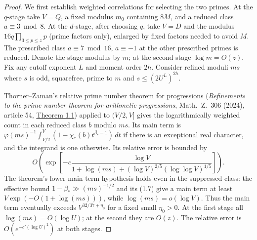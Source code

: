 \begin{proof}
We first establish weighted correlations for selecting the two primes.
At the \(q\)-stage take \(V=Q\), a fixed modulus \(m_0\) containing
\(8M\), and a reduced class \(a\equiv3\bmod8\).
At the \(d\)-stage, after choosing \(q\), take \(V=D\) and the
modulus \(16q\prod_{3\le p\le z}p\) (prime factors only), enlarged
by fixed factors needed to avoid \(M\).  The prescribed class
\(a\equiv7\bmod16\), \(a\equiv-1\) at the other prescribed primes
is reduced. Denote the stage modulus by \(m\); at the second
stage \(\log m=O(z)\).  Fix any cutoff exponent \(L\) and moment
order \(2h\). Consider refined moduli \(ms\) where \(s\) is odd,
squarefree, prime to \(m\) and \(s\le(2U^L)^{2h}\).

Thorner--Zaman's relative prime number theorem for progressions
(\emph{Refinements to the prime number theorem for arithmetic
progressions}, Math.\ Z.\ 306 (2024), article 54,
\href{https://arxiv.org/abs/2108.10878}{Theorem 1.1})
applied to \((V/2,V]\) gives the logarithmically weighted count
in each reduced class \(b\) modulo \(ms\). Its main term is
\(\varphi(ms)^{-1}\int_{V/2}^V(1-\chi_*(b)t^{\beta_*-1})\,dt\)
if there is an exceptional real character, and the integrand is one
otherwise. Its relative error is bounded by
\[
 O\left(\exp\left[-c\frac{\log V}
 {1+\log(ms)+(\log V)^{2/5}(\log\log V)^{1/5}}\right]\right).
\]
The theorem's lower-main-term hypothesis holds even in the suppressed
class: the effective bound \(1-\beta_*\gg(ms)^{-1/2}\) and its
(1.7) give a main term at least \(V\exp(-O(1+\log(ms)))\), while
\(\log(ms)=o(\log V)\). Thus the main term eventually exceeds
\(V^{32/37+\eta_0}\) for a fixed small \(\eta_0>0\).
At the first stage all \(\log(ms)=O(\log U)\); at the second
they are \(O(z)\). The relative error is \(O(e^{-c'(\log U)^2})\)
at both stages.


\end{proof}
